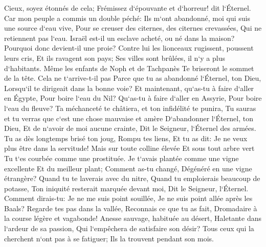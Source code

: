 \verse Cieux, soyez étonnés de cela; Frémissez d`épouvante et d`horreur! dit l`Éternel. 
\verse Car mon peuple a commis un double péché: Ils m`ont abandonné, moi qui suis une source d`eau vive, Pour se creuser des citernes, des citernes crevassées, Qui ne retiennent pas l`eau. 
\verse Israël est-il un esclave acheté, ou né dans la maison? Pourquoi donc devient-il une proie? 
\verse Contre lui les lionceaux rugissent, poussent leurs cris, Et ils ravagent son pays; Ses villes sont brûlées, il n`y a plus d`habitants. 
\verse Même les enfants de Noph et de Tachpanès Te briseront le sommet de la tête. 
\verse Cela ne t`arrive-t-il pas Parce que tu as abandonné l`Éternel, ton Dieu, Lorsqu`il te dirigeait dans la bonne voie? 
\verse Et maintenant, qu`as-tu à faire d`aller en Égypte, Pour boire l`eau du Nil? Qu`as-tu à faire d`aller en Assyrie, Pour boire l`eau du fleuve? 
\verse Ta méchanceté te châtiera, et ton infidélité te punira, Tu sauras et tu verras que c`est une chose mauvaise et amère D`abandonner l`Éternel, ton Dieu, Et de n`avoir de moi aucune crainte, Dit le Seigneur, l`Éternel des armées. 
\verse Tu as dès longtemps brisé ton joug, Rompu tes liens, Et tu as dit: Je ne veux plus être dans la servitude! Mais sur toute colline élevée Et sous tout arbre vert Tu t`es courbée comme une prostituée. 
\verse Je t`avais plantée comme une vigne excellente Et du meilleur plant; Comment as-tu changé, Dégénéré en une vigne étrangère? 
\verse Quand tu te laverais avec du nitre, Quand tu emploierais beaucoup de potasse, Ton iniquité resterait marquée devant moi, Dit le Seigneur, l`Éternel. 
\verse Comment dirais-tu: Je ne me suis point souillée, Je ne suis point allée après les Baals? Regarde tes pas dans la vallée, Reconnais ce que tu as fait, Dromadaire à la course légère et vagabonde! 
\verse Anesse sauvage, habituée au désert, Haletante dans l`ardeur de sa passion, Qui l`empêchera de satisfaire son désir? Tous ceux qui la cherchent n`ont pas à se fatiguer; Ils la trouvent pendant son mois. 
